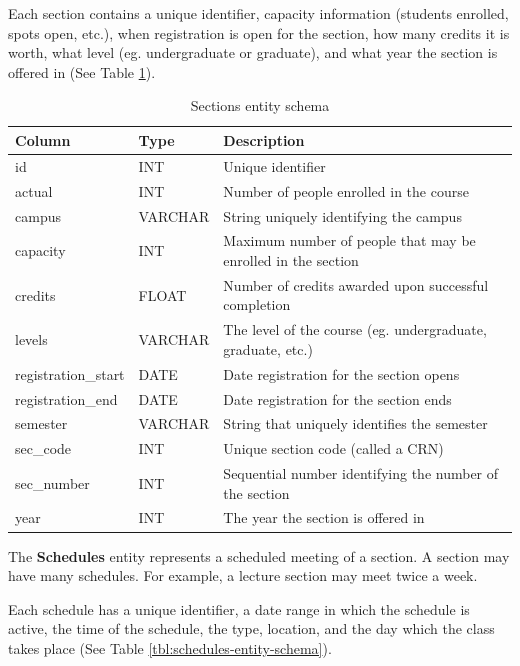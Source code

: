 \documentclass[12pt,letterpaper,oneside,notitlepage]{report}
\theoremstyle{definition}
\begin{document}
			Each section contains a unique identifier, capacity information (students enrolled, spots open, etc.), when registration is open for the section, how many credits it is worth, what level (eg. undergraduate or graduate), and what year the section is offered in (See Table \ref{tbl:sections-entity-schema}).
			
			\begin{table}[!htp]
				\centering
				\begin{tabular}{lll}
					\toprule
					Column & Type & Description \\
					\midrule
					id & INT & Unique identifier \\
					actual & INT & Number of people enrolled in the course \\
					campus & VARCHAR & String uniquely identifying the campus \\
					capacity & INT & Maximum number of people that may be enrolled in the section \\
					credits & FLOAT & Number of credits awarded upon successful completion \\
					levels & VARCHAR & The level of the course (eg. undergraduate, graduate, etc.) \\
					registration\_start & DATE & Date registration for the section opens \\
					registration\_end & DATE & Date registration for the section ends \\
					semester & VARCHAR & String that uniquely identifies the semester \\
					sec\_code & INT & Unique section code (called a CRN) \\
					sec\_number & INT & Sequential number identifying the number of the section \\
					year & INT & The year the section is offered in \\
					\bottomrule
				\end{tabular}
				\caption{Sections entity schema}
				\label{tbl:sections-entity-schema}
			\end{table}
			
			The \textbf{Schedules} entity represents a scheduled meeting of a section.  A section may have many schedules.  For example, a lecture section may meet twice a week.
			
			Each schedule has a unique identifier, a date range in which the schedule is active, the time of the schedule, the type, location, and the day which the class takes place (See Table \ref{tbl:schedules-entity-schema}).
			
\end{document}
